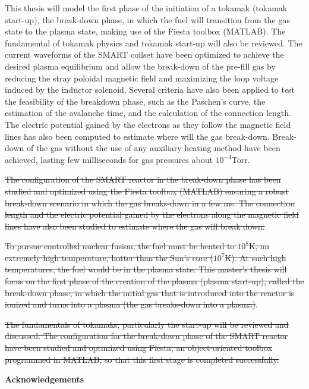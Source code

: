 \documentclass[a4paper,12pt,oneside]{book}
\begin{document}
This thesis will model the first phase of the initiation of a tokamak (tokamak start-up), the break-down phase, in which the fuel will transition from the gas state to the plasma state, making use of the Fiesta toolbox (MATLAB). The fundamental of tokamak physics and tokamak start-up will also be reviewed. The current waveforms of the SMART coilset have been optimized to achieve the desired plasma equilibrium and allow the break-down of the pre-fill gas by reducing the stray poloidal magnetic field and maximizing the loop voltage induced by the inductor solenoid. Several criteria have also been applied to test the feasibility of the breakdown phase, such as the Paschen's curve, the estimation of the avalanche time, and the calculation of the connection length. The electric potential gained by the electrons as they follow the magnetic field lines has also been computed to estimate where will the gas break-down. Break-down of the gas without the use of any auxiliary heating method have been achieved, lasting few milliseconds for gas pressures about $10^{-4}$Torr.




\st{The configuration of the SMART reactor in the break-down phase has been studied and optimized using the Fiesta toolbox (MATLAB) ensuring a robust break-down scenario in which the gas breaks-down in a few ms. The connection length and the electric potential gained by the electrons along the magnetic field lines have also been studied to estimate where the gas will break down.}

\st{To pursue controlled nuclear fusion, the fuel must be heated to $10^8$K, an extremely high temperature, hotter than the Sun's core ($10^7$K). At such high temperatures, the fuel would be in the plasma state. This master's thesis will focus on the first phase of the creation of the plasma (plasma start-up), called the break-down phase, in which the initial gas that is introduced into the reactor is ionized and turns into a plasma (the gas breaks-down into a plasma)}.

\st{The fundamentals of tokamaks, particularly the start-up will be reviewed and discussed. The configuration for the break-down phase of the SMART reactor have been studied and optimized using Fiesta, an object-oriented toolbox programmed in MATLAB, so that this first stage is completed successfully.}


\newpage

\begin{center}
\begin{large}
\textbf{Acknowledgements}
\end{large}

\end{center}
\end{document}
